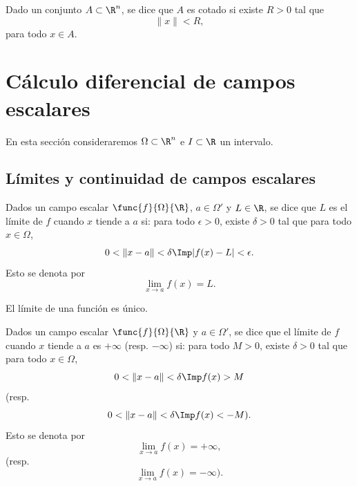 \documentclass[a4,11pt]{aleph-notas}
\begin{document}
\begin{defi}
    Dado un conjunto $A\subset \R^n$, se dice que $A$ es cotado si existe $R>0$ tal que
    \[
        \|x\|<R,
    \]
    para todo $x\in A$.
\end{defi}



\section{Cálculo diferencial de campos escalares}


En esta sección consideraremos $\Omega\subset \R^n$ e $I\subset\R$ un intervalo.

\subsection{Límites y continuidad de campos escalares}

\begin{defi}[Límite]
    Dados un campo escalar $\func{f}{\Omega}{\R}$, $a\in \Omega'$ y $L\in\R$, se dice que $L$ es el límite de $f$ cuando $x$ tiende a $a$ si: para todo $\epsilon>0$, existe $\delta>0$ tal que para todo $x\in \Omega$,
    \[
        0<\|x-a\|<\delta \Imp |f(x)-L| < \epsilon. 
    \]
    Esto se denota por
    \[
        \lim_{x\to a}f(x)=L.
    \]
\end{defi}

\begin{prop}
	El límite de una función es único.
\end{prop}

\begin{defi}
    Dados un campo escalar $\func{f}{\Omega}{\R}$ y $a\in \Omega'$, se dice que el límite de $f$ cuando $x$ tiende a $a$ es $+\infty$ (resp. $-\infty$) si: para todo $M>0$, existe $\delta>0$ tal que para todo $x\in \Omega$,
    \[
        0<\|x-a\|<\delta \Imp f(x) > M 
    \]
    (resp. 
    \[
        0<\|x-a\|<\delta \Imp f(x) < -M ).
    \]
    Esto se denota por
    \[
        \lim_{x\to a}f(x)=+\infty,
    \]
    (resp. 
    \[
        \lim_{x\to a}f(x)=-\infty).
    \]
\end{defi}
\end{document}
